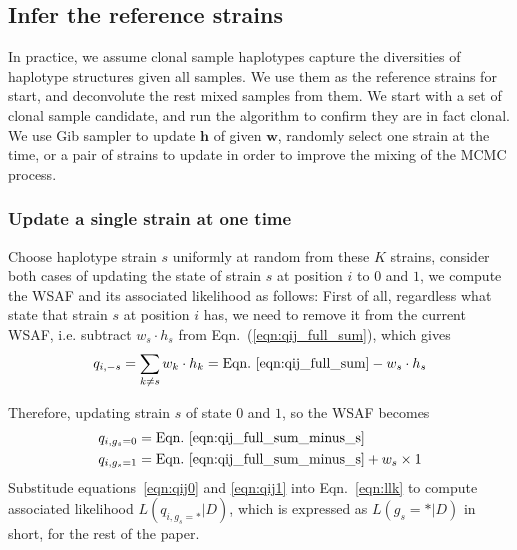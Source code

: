 \documentclass{bioinfo}
\begin{document}
\begin{methods}



\subsection{Infer the reference strains}\label{sec:ref:build}
In practice, we assume clonal sample haplotypes capture the diversities of haplotype structures given all samples. We use them as the reference strains for start, and deconvolute the rest mixed samples from them. We start with a set of clonal sample candidate, and run the algorithm to confirm they are in fact clonal. We use Gib sampler to update $\mathbf h$ of given $\mathbf w$, randomly select one strain at the time, or a pair of strains to update in order to improve the mixing of the MCMC process.

\subsubsection{Update a single strain at one time}

Choose haplotype strain $s$ uniformly at random from these $K$ strains, consider both cases of updating the state of strain $s$ at position $i$ to $0$ and $1$, we compute the WSAF and its associated likelihood as follows: First of all, regardless what state that strain $s$ at position $i$ has, we need to remove it from the current WSAF, i.e. subtract $ w_s \cdot h_s$ from Eqn.~(\ref{eqn:qij_full_sum}), which gives
\begin{equation}
q_{i,-s} = \sum_{k\neq s} w_k \cdot h_k = \textrm{Eqn.~\eqref{eqn:qij_full_sum}} -  w_s \cdot h_s \label{eqn:qij_full_sum_minus_s}
\end{equation}

Therefore, updating strain $s$ of state $0$ and $1$, so the WSAF becomes
\begin{align}
q_{i,g_s=0} & = \textrm{Eqn.~\eqref{eqn:qij_full_sum_minus_s}} \label{eqn:qij0}\\
q_{i,g_s=1} & = \textrm{Eqn.~\eqref{eqn:qij_full_sum_minus_s}} + w_s \times 1 \label{eqn:qij1}
\end{align}
Substitude equations~\eqref{eqn:qij0} and \eqref{eqn:qij1} into Eqn.~\eqref{eqn:llk} to compute associated likelihood $L(q_{i,g_s=*} |D)$, which is expressed as $L(g_s=* |D)$ in short, for the rest of the paper.



\end{methods}
\end{document}
